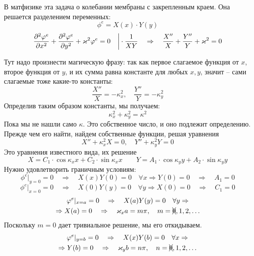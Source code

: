 В матфизике эта задача о колебании мембраны с закрепленным краем. Она решается разделением переменных:
\begin{equation}
	\phi^e=X(x)\cdot Y(y)
\end{equation}
\begin{equation}
	\pdv[2]{\phi^e}{x}
		+\pdv[2]{\phi^e}{y}
			+\kappa^2 \phi^e =0  \quad \bigg| \cdot \frac{1}{XY}
	\quad \Rightarrow \quad
		\frac{X''}{X}+\frac{Y''}{Y}+\varkappa^2=0
\end{equation}

Тут надо произнести магическую фразу: так как первое слагаемое функция от $x$, второе функция от $y$, и их сумма равна константе для любых $x,y$, значит -- сами слагаемые тоже какие-то константы:
\begin{equation}
	\frac{X''}{X}=-\kappa_x^2, \quad
	\frac{Y''}{Y}=-\kappa_y^2
\end{equation}
Определив таким образом константы, мы получаем:
\begin{equation}
	\kappa_x^2+ \kappa_y^2=\kappa^2
\end{equation}
Пока мы не нашли само $\kappa$. Это собственное число, и оно подлежит определению. Прежде чем его найти, найдем собственные функции, решая уравнения
\begin{equation}
	X''+\kappa_x^2X=0, \quad Y''+\kappa_y^2Y=0
\end{equation}	
Это уравнения известного вида, их решение
\begin{equation}
	X=C_1\cdot\cos{\kappa_x x}+
		C_2\cdot\sin{\kappa_x x}
	\qquad
	Y=A_1\cdot\cos{\kappa_y y}+
		A_2\cdot\sin{\kappa_y y}	
\end{equation}
Нужно удовлетворить граничным условиям: 
\begin{equation}
	\phi^e|_{y=0}=0 \quad \Rightarrow \quad
		X(x)Y(0)=0 \quad \forall x \Rightarrow
		Y(0)=0 \quad \Rightarrow \quad A_1=0
\end{equation}
\begin{equation}
	\phi^e|_{x=0}=0 \quad \Rightarrow \quad
		X(0)Y(y)=0 \quad \forall y \Rightarrow
		X(0)=0 \quad \Rightarrow \quad C_1=0
\end{equation}
\begin{gather}
	\phi^e|_{x=a}=0 \quad \Rightarrow \quad
		X(a)Y(y)=0 \quad \forall y  \Rightarrow  \\ \Rightarrow
		X(a)=0 \quad \Rightarrow \quad \kappa_x a = m\pi, \quad m=\xcancel{0},1,2,\ldots
\end{gather}
Поскольку $m=0$ дает тривиальное решение, мы его откидываем.
\begin{gather}
	\phi^e|_{y=b}=0 \quad \Rightarrow \quad
		X(x)Y(b)=0 \quad \forall x  \Rightarrow  \\ \Rightarrow
		Y(b)=0 \quad \Rightarrow \quad \kappa_y b = n\pi , \quad n=\xcancel{0},1,2,\ldots
\end{gather}
